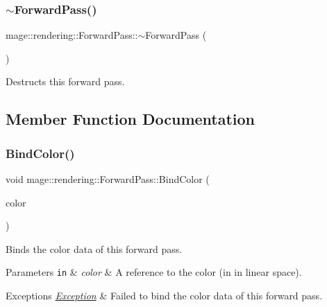 \subsubsection{\texorpdfstring{$\sim$\+Forward\+Pass()}{~ForwardPass()}}
{\footnotesize\ttfamily mage\+::rendering\+::\+Forward\+Pass\+::$\sim$\+Forward\+Pass (\begin{DoxyParamCaption}{ }\end{DoxyParamCaption})\hspace{0.3cm}{\ttfamily [default]}}

Destructs this forward pass. 

\subsection{Member Function Documentation}
\hypertarget{classmage_1_1rendering_1_1_forward_pass_a1431c5d2bd8cccc55427aa1cf9a64845}{}\label{classmage_1_1rendering_1_1_forward_pass_a1431c5d2bd8cccc55427aa1cf9a64845} 
\subsubsection{\texorpdfstring{Bind\+Color()}{BindColor()}}
{\footnotesize\ttfamily void mage\+::rendering\+::\+Forward\+Pass\+::\+Bind\+Color (\begin{DoxyParamCaption}\item[{const \hyperlink{structmage_1_1_r_g_b_a}{R\+G\+BA} \&}]{color }\end{DoxyParamCaption})\hspace{0.3cm}{\ttfamily [private]}}

Binds the color data of this forward pass.


\begin{DoxyParams}[1]{Parameters}
\mbox{\tt in}  & {\em color} & A reference to the color (in in linear space). \\
\hline
\end{DoxyParams}

\begin{DoxyExceptions}{Exceptions}
{\em \hyperlink{classmage_1_1_exception}{Exception}} & Failed to bind the color data of this forward pass. \\
\hline
\end{DoxyExceptions}
\hypertarget{classmage_1_1rendering_1_1_forward_pass_af66584e7efc3565f23f7b5940d6f35eb}{}\label{classmage_1_1rendering_1_1_forward_pass_af66584e7efc3565f23f7b5940d6f35eb} 
